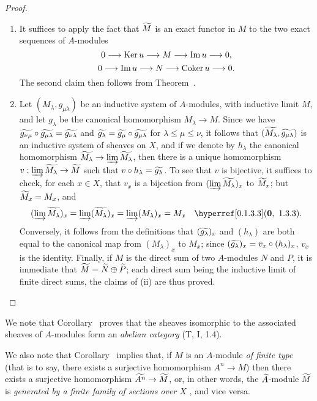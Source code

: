 \begin{proof}
\label{proof-1.1.3.9}
\medskip\noindent
\begin{enumerate}[label=(\roman*)]
  \item It suffices to apply the fact that ${\widetilde{M}}$ is an exact functor in $M$  to the two exact sequences of $A$-modules
    \[
      0\to\Ker u\to M\to\Im u\to 0,
    \]
    \[
      0\to\Im u\to N\to\Coker u\to 0.
    \]
    The second claim then follows from Theorem~.
  \item Let $(M_\lambda,g_{\mu\lambda})$ be an inductive system of $A$-modules, with inductive limit $M$, and let $g_\lambda$ be the canonical homomorphism $M_\lambda\to M$.
    Since we have ${\widetilde{g_{\nu\mu}}}\circ{\widetilde{g_{\mu\lambda}}}={\widetilde{g_{\nu\lambda}}}$ and ${\widetilde{g_\lambda}}={\widetilde{g_\mu}}\circ{\widetilde{g_{\mu\lambda}}}$ for $\lambda\leq\mu\leq\nu$, it follows that $({\widetilde{M_\lambda}},{\widetilde{g_{\mu\lambda}}})$ is an inductive system of sheaves on $X$, and if we denote by $h_\lambda$ the canonical homomorphism $\wt{M_\lambda}\to\varinjlim\wt{M_\lambda}$, then there is a unique homomorphism $v:\varinjlim\wt{M_\lambda}\to\wt{M}$ such that $v\circ h_\lambda={\widetilde{g_\lambda}}$.
    To see that $v$ is bijective, it suffices to check, for each $x\in X$, that $v_x$ is a bijection from $(\varinjlim{\widetilde{M_\lambda}})_x$ to ${\widetilde{M}}_x$;
    but ${\widetilde{M}}_x=M_x$, and
    \[
      (\varinjlim\wt{M_\lambda})_x=\varinjlim(\wt{M_\lambda})_x
      =\varinjlim(M_\lambda)_x=M_x\quad\sref[0]{0.1.3.3}.
    \]
    Conversely, it follows from the definitions that $({\widetilde{g_\lambda}})_x$ and
    $(h_\lambda)$ are both equal to the canonical map from $(M_\lambda)_x$ to $M_x$;
    since $({\widetilde{g_\lambda}})_x=v_x\circ(h_\lambda)_x$, $v_x$ is the identity.
    Finally, if $M$ is the direct sum of two $A$-modules $N$ and $P$, it is immediate that ${\widetilde{M}}={\widetilde{N}}\oplus{\widetilde{P}}$;
    each direct sum being the inductive limit of finite direct sums, the claims of (ii) are thus proved.
\end{enumerate}
\end{proof}

We note that Corollary~ proves that the sheaves isomorphic to the associated sheaves of $A$-modules form an \emph{abelian category} (T, I, 1.4).

We also note that Corollary~ implies that, if $M$ is an $A$-module \emph{of finite type} (that is to say, there exists a surjective homomorphism $A^n\to M$) then there exists a surjective homomorphism $\wt{A^n}\to\wt{M}$, or, in other words, the ${\widetilde{A}}$-module ${\widetilde{M}}$ is \emph{generated by a finite family of sections over $X$} , and vice versa.

